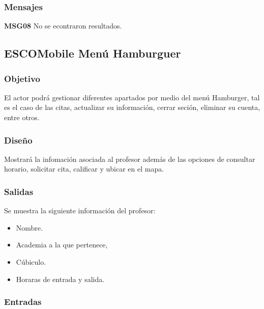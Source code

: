 \subsubsection{Mensajes}
\begin{Citemize}
	\item {\bf MSG08} No se econtraron resultados.
\end{Citemize}


\pagebreak
\subsection{ESCOMobile Menú Hamburguer}

\subsubsection{Objetivo}
	El actor podrá gestionar diferentes apartados por medio del menú Hamburger, tal es el caso de las citas, actualizar su información, cerrar seción, eliminar su cuenta, entre otros.

\subsubsection{Diseño}
	Mostrará la infomación asociada al profesor además de las opciones de consultar horario, solicitar cita, calificar y ubicar en el mapa. 


\subsubsection{Salidas}
	Se muestra la siguiente información del profesor:
	\begin{itemize}
		\item Nombre.
		\item Academia a la que pertenece,
		\item Cúbiculo.
		\item Horaras de entrada y salida. 
	\end{itemize}

\subsubsection{Entradas}

